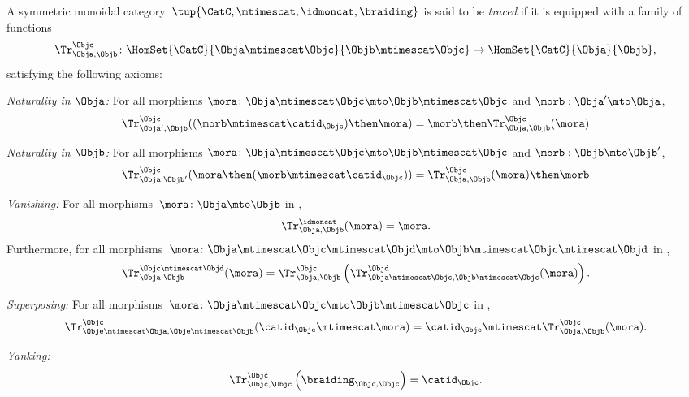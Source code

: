 \begin{ctdefinition}\label{def:traced-monoidal-cat}
    \label{def:traced-monoidal-category}
    A symmetric monoidal category~$\tup{\CatC,\mtimescat,\idmoncat, \braiding}$ is said to be \emph{traced} if it is equipped with a family of functions
    \begin{equation}
        \Tr_{\Obja,\Objb}^\Objc\colon \HomSet{\CatC}{\Obja \mtimescat \Objc}{\Objb\mtimescat \Objc}\to \HomSet{\CatC}{\Obja}{\Objb},
    \end{equation}
    satisfying the following axioms:
    \begin{compactenum}
    	\item \emph{Naturality in $\Obja$:} For all morphisms $\mora\colon \Obja\mtimescat \Objc \mto \Objb\mtimescat \Objc$ and $\morb : \Obja' \mto \Obja$,
	\begin{equation}
            \Tr_{\Obja', \Objb}^\Objc ( (\morb \mtimescat \catid_\Objc) \then \mora) = \morb \then \Tr_{\Obja, \Objb}^\Objc (\mora) 
        \end{equation}
	\item \emph{Naturality in $\Objb$:} For all morphisms $\mora\colon \Obja\mtimescat \Objc \mto \Objb\mtimescat \Objc$ and $\morb : \Objb \mto \Objb'$,
	\begin{equation}
            \Tr_{\Obja, \Objb'}^\Objc ( \mora \then (\morb \mtimescat \catid_\Objc) ) =  \Tr_{\Obja, \Objb}^\Objc (\mora) \then \morb
        \end{equation}
        \item \emph{Vanishing:} For all morphisms~$\mora \colon \Obja\mto \Objb$ in \CatC,
        \begin{equation}
            \label{eq:vanishing_1}
            \Tr_{\Obja,\Objb}^\idmoncat (\mora)=\mora.
        \end{equation}
        Furthermore, for all morphisms~$\mora \colon \Obja\mtimescat \Objc \mtimescat \Objd \mto \Objb\mtimescat \Objc \mtimescat \Objd$ in \CatC,
        \begin{equation}
            \label{eq:vanishing_2}
            \Tr_{\Obja,\Objb}^{\Objc\mtimescat \Objd}(\mora)=\Tr_{\Obja,\Objb}^\Objc\left(
            \Tr_{\Obja \mtimescat \Objc , \Objb \mtimescat \Objc}^\Objd(\mora)\right).
        \end{equation}
        \item \emph{Superposing:} For all morphisms~$\mora\colon \Obja\mtimescat \Objc \mto \Objb\mtimescat \Objc$ in \CatC,
        \begin{equation}
            \label{eq:superposing}
            \Tr_{\Obje\mtimescat \Obja,\Obje\mtimescat \Objb}^{\Objc}(\catid_\Obje\mtimescat \mora)=\catid_\Obje\mtimescat \Tr_{\Obja,\Objb}^\Objc(\mora).
        \end{equation}
        \item \emph{Yanking:}
        \begin{equation}
            \label{eq:yanking}
            \Tr_{\Objc,\Objc}^\Objc\left(\braiding_{\Objc,\Objc}\right)=\catid_\Objc.
        \end{equation}
    \end{compactenum}
\end{ctdefinition}

